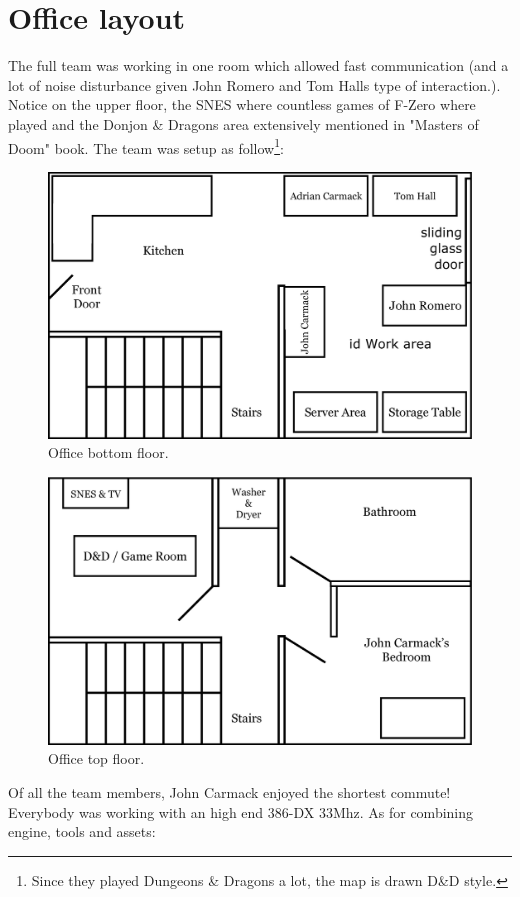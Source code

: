 \documentclass[book.tex]{subfiles}
\begin{document}
\section{Office layout}
The full team was working in one room which allowed fast communication (and a lot of noise disturbance given John Romero and Tom Halls type of interaction.). Notice on the upper floor, the SNES where countless games of F-Zero where played and the Donjon \& Dragons area extensively mentioned in "Masters of Doom" book.
The team was setup as follow\footnote{Since they played Dungeons \& Dragons a lot, the map is drawn D\&D style.}:
\par
\begin{figure}[H]
  \centering
  \includegraphics[width=\textwidth]{map/id-software-office-madison_bottom_floor.eps}
 \caption{Office bottom floor.} 
\end{figure}
\par
\begin{figure}[H]
  \centering
  \includegraphics[width=\textwidth]{map/id-software-office-madison_top_floor.eps}
 \caption{Office top floor.} 
\end{figure}
Of all the team members, John Carmack enjoyed the shortest commute! Everybody was working with an high end 386-DX 33Mhz. As for combining engine, tools and assets:\\
\end{document}
